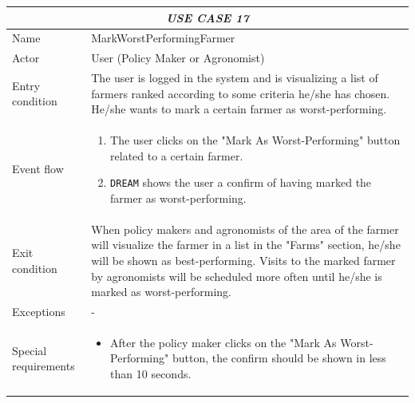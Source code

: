 \documentclass{article}
\begin{document}

\centering
\begin{longtable}{|p{3.5cm}|m{8cm}|}
 \hline
 \multicolumn{2}{|c|}{\cellcolor{white}\emph{USE CASE 17}} \\
 \endfirsthead
 \endhead
 \endfoot
 \endlastfoot
 \hline
 Name & MarkWorstPerformingFarmer\\
 \hline
 Actor & User (Policy Maker or Agronomist)\\
 \hline
 Entry condition & The user is logged in the system and is visualizing a list of farmers ranked according to some criteria he/she has chosen. He/she wants to mark a certain farmer as worst-performing.\\
 \hline
 Event flow & \begin{enumerate}
    \item The user clicks on the "Mark As Worst-Performing" button related to a certain farmer.
    \item \verb|DREAM| shows the user a confirm of having marked the farmer as worst-performing.
 \end{enumerate}\\
 \hline
 Exit condition &  When policy makers and agronomists of the area of the farmer will visualize the farmer in a list in the "Farms" section, he/she will be shown as best-performing.
 Visits to the marked farmer by agronomists will be scheduled more often until he/she is marked as worst-performing.\\
 \hline
 Exceptions & -\\
 \hline
 Special requirements &\begin{itemize}
     \item After the policy maker clicks on the "Mark As Worst-Performing" button, the confirm should be shown in less than 10 seconds.
 \end{itemize}\\
 \hline
\end{longtable}
\end{document}
